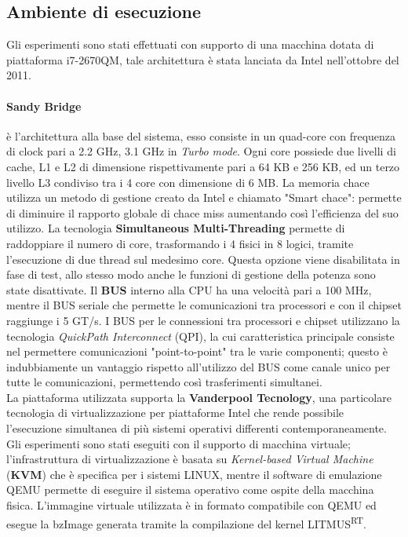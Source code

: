 \newpage

\subsection{Ambiente di esecuzione}
\label{sec:ambiente}

\noindent Gli esperimenti sono stati effettuati con supporto di una macchina dotata di piattaforma i7-2670QM, tale architettura è stata lanciata da Intel nell'ottobre del 2011.

\paragraph{Sandy Bridge} è l'architettura alla base del sistema, esso consiste in un quad-core con frequenza di clock pari a 2.2 GHz, 3.1 GHz in \textit{Turbo mode}. Ogni core possiede due livelli di cache, L1 e L2 di dimensione rispettivamente pari a 64 KB e 256 KB, ed un terzo livello L3 condiviso tra i 4 core con dimensione di 6 MB. La memoria chace utilizza un metodo di gestione creato da Intel e chiamato "Smart chace": permette di diminuire il rapporto globale di chace miss aumentando così l'efficienza del suo utilizzo. La tecnologia \textbf{Simultaneous Multi-Threading} permette di raddoppiare il numero di core, trasformando i 4 fisici in 8 logici, tramite l'esecuzione di due thread sul medesimo core. Questa opzione viene disabilitata in fase di test, allo stesso modo anche le funzioni di gestione della potenza sono state disattivate. Il \textbf{BUS} interno alla CPU ha una velocità pari a 100 MHz, mentre il BUS seriale che permette le comunicazioni tra processori e con il chipset raggiunge i 5 GT/s. I BUS per le connessioni tra processori e chipset utilizzano la tecnologia \textit{QuickPath Interconnect} (QPI), la cui caratteristica principale consiste nel permettere comunicazioni "point-to-point" tra le varie componenti; questo è indubbiamente un vantaggio rispetto all'utilizzo del BUS come canale unico per tutte le comunicazioni, permettendo così trasferimenti simultanei.\\
La piattaforma utilizzata supporta la \textbf{Vanderpool Tecnology}, una particolare tecnologia di virtualizzazione per piattaforme Intel che rende possibile l'esecuzione simultanea di più sistemi operativi differenti contemporaneamente.\\

\noindent Gli esperimenti sono stati eseguiti con il supporto di macchina virtuale; l'infrastruttura di virtualizzazione è basata su \textit{Kernel-based Virtual Machine} (\textbf{KVM}) che è specifica per i sistemi LINUX, mentre il software di emulazione QEMU permette di eseguire il sistema operativo come ospite della macchina fisica. L'immagine virtuale utilizzata è in formato compatibile con QEMU ed esegue la bzImage generata tramite la compilazione del kernel LITMUS\textsuperscript{RT}.\\

